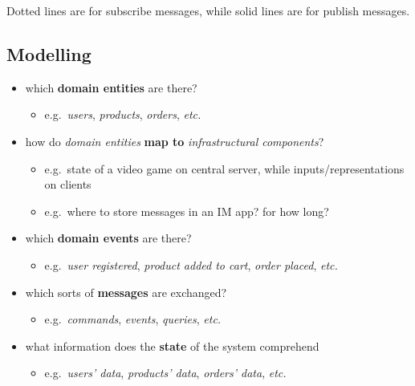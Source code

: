 \documentclass{scrartcl}
\begin{document}
  Dotted lines are for subscribe messages, while solid lines are for publish messages. \newline

\subsection{Modelling}\label{modelling}

\begin{itemize}
  \item which \textbf{domain entities} are there?

  \begin{itemize}
    \item e.g.~\emph{users}, \emph{products}, \emph{orders}, \emph{etc.}
  \end{itemize}
  \item how do \emph{domain entities} \textbf{map to} \emph{infrastructural
  components}?

  \begin{itemize}
    \item e.g.~state of a video game on central server, while
    inputs/representations on clients
    \item e.g.~where to store messages in an IM app? for how long?
  \end{itemize}
  \item which \textbf{domain events} are there?

  \begin{itemize}
    \item e.g.~\emph{user registered}, \emph{product added to cart},
    \emph{order placed}, \emph{etc.}
  \end{itemize}
  \item which sorts of \textbf{messages} are exchanged?

  \begin{itemize}
    \item e.g.~\emph{commands}, \emph{events}, \emph{queries}, \emph{etc.}
  \end{itemize}
  \item what information does the \textbf{state} of the system comprehend

  \begin{itemize}
    \item e.g.~\emph{users' data}, \emph{products' data}, \emph{orders' data},
    \emph{etc.}
  \end{itemize}
\end{itemize}
\end{document}
